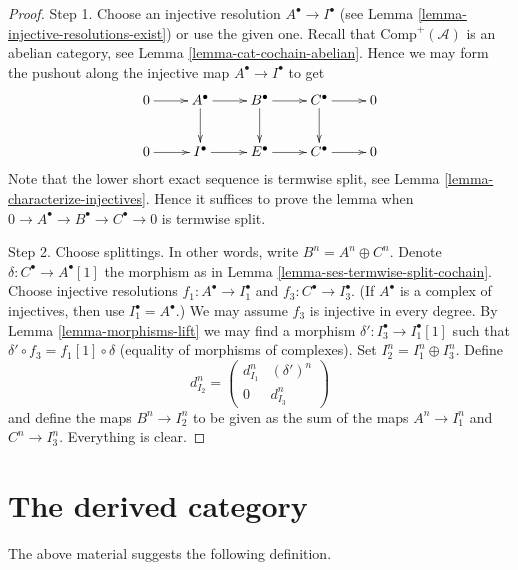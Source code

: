 \begin{proof}
Step 1. Choose an injective resolution $A^\bullet \to I^\bullet$ (see
Lemma \ref{lemma-injective-resolutions-exist}) or use the given one.
Recall that $\text{Comp}^{+}(\mathcal{A})$ is an
abelian category, see Lemma \ref{lemma-cat-cochain-abelian}.
Hence we may form the pushout along
the injective map $A^\bullet \to I^\bullet$ to get
$$
\xymatrix{
0 \ar[r] &
A^\bullet \ar[r] \ar[d] &
B^\bullet \ar[r] \ar[d] &
C^\bullet \ar[r] \ar[d] &
0 \\
0 \ar[r] &
I^\bullet \ar[r] &
E^\bullet \ar[r] &
C^\bullet \ar[r] &
0
}
$$
Note that the lower short exact sequence is termwise split, see
Lemma \ref{lemma-characterize-injectives}. Hence it suffices to
prove the lemma when
$0 \to A^\bullet \to B^\bullet \to C^\bullet \to 0$ is
termwise split.

\medskip\noindent
Step 2. Choose splittings. In other words, write
$B^n = A^n \oplus C^n$. Denote $\delta : C^\bullet \to A^\bullet[1]$
the morphism as in Lemma \ref{lemma-ses-termwise-split-cochain}. Choose
injective resolutions $f_1 : A^\bullet \to I_1^\bullet$
and $f_3 : C^\bullet \to I_3^\bullet$. (If $A^\bullet$ is a complex of
injectives, then use $I_1^\bullet = A^\bullet$.)
We may assume $f_3$ is injective in
every degree. By Lemma \ref{lemma-morphisms-lift} we may find
a morphism $\delta' : I_3^\bullet \to I_1^\bullet[1]$ such
that $\delta' \circ f_3 = f_1[1] \circ \delta$ (equality of
morphisms of complexes). Set $I_2^n = I_1^n \oplus I_3^n$.
Define
$$
d_{I_2}^n =
\left(
\begin{matrix}
d_{I_1}^n & (\delta')^n \\
0 & d_{I_3}^n
\end{matrix}
\right)
$$
and define the maps $B^n \to I_2^n$ to be given as the
sum of the maps $A^n \to I_1^n$ and $C^n \to I_3^n$.
Everything is clear.
\end{proof}
















\section{The derived category}
\label{section-derived-category}

\noindent
The above material suggests the following definition.


